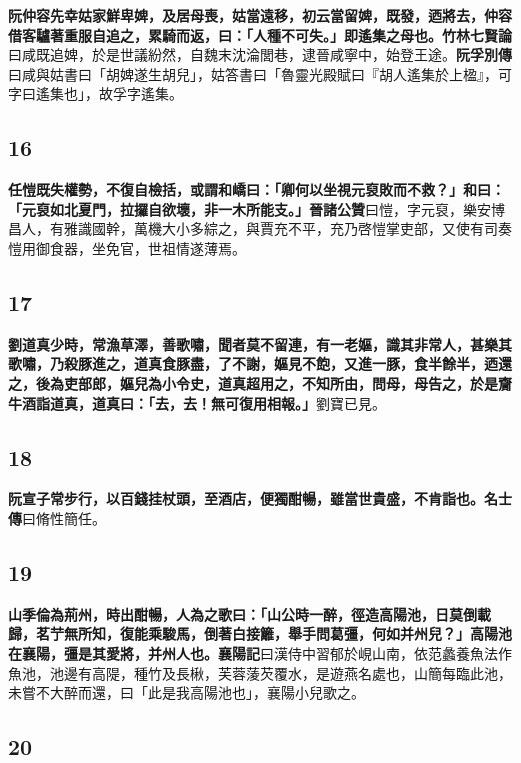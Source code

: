 \textbf{阮仲容先幸姑家鮮卑婢，及居母喪，姑當遠移，初云當留婢，既發，迺將去，仲容借客驢著重服自追之，累騎而返，曰：「人種不可失。」即遙集之母也。}{\footnotesize \textbf{竹林七賢論}曰咸既追婢，於是世議紛然，自魏末沈淪閭巷，逮晉咸寧中，始登王途。\textbf{阮孚別傳}曰咸與姑書曰「胡婢遂生胡兒」，姑答書曰「魯靈光殿賦曰『胡人遙集於上楹』，可字曰遙集也」，故孚字遙集。}

\subsection*{16}

\textbf{任愷既失權勢，不復自檢括，或謂和嶠曰：「卿何以坐視元裒敗而不救？」和曰：「元裒如北夏門，拉攞自欲壞，非一木所能支。」}{\footnotesize \textbf{晉諸公贊}曰愷，字元裒，樂安博昌人，有雅識國幹，萬機大小多綜之，與賈充不平，充乃啓愷掌吏部，又使有司奏愷用御食器，坐免官，世祖情遂薄焉。}

\subsection*{17}

\textbf{劉道真少時，常漁草澤，善歌嘯，聞者莫不留連，有一老嫗，識其非常人，甚樂其歌嘯，乃殺豚進之，道真食豚盡，了不謝，嫗見不飽，又進一豚，食半餘半，迺還之，後為吏部郎，嫗兒為小令史，道真超用之，不知所由，問母，母告之，於是齎牛酒詣道真，道真曰：「去，去！無可復用相報。」}{\footnotesize 劉寶已見。}

\subsection*{18}

\textbf{阮宣子常步行，以百錢挂杖頭，至酒店，便獨酣暢，雖當世貴盛，不肯詣也。}{\footnotesize \textbf{名士傳}曰脩性簡任。}

\subsection*{19}

\textbf{山季倫為荊州，時出酣暢，人為之歌曰：「山公時一醉，徑造高陽池，日莫倒載歸，茗艼無所知，復能乘駿馬，倒著白接籬，舉手問葛彊，何如并州兒？」高陽池在襄陽，彊是其愛將，并州人也。}{\footnotesize \textbf{襄陽記}曰漢侍中習郁於峴山南，依范蠡養魚法作魚池，池邊有高隄，種竹及長楸，芙蓉蔆芡覆水，是遊燕名處也，山簡每臨此池，未嘗不大醉而還，曰「此是我高陽池也」，襄陽小兒歌之。}

\subsection*{20}

